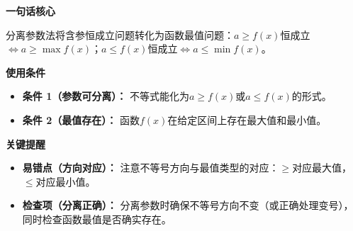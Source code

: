 \begin{summarybox}

	\textbf{\textcolor{CSummary}{一句话核心}}

	分离参数法将含参恒成立问题转化为函数最值问题：$a\ge f(x)$恒成立$\iff a\ge \max f(x)$；$a\le f(x)$恒成立$\iff a\le \min f(x)$。

	\medskip
	\textbf{\textcolor{CSummary}{使用条件}}
	\begin{itemize}[leftmargin=*, itemsep=0.5em, topsep=0.4em]
		\item \textbf{条件 1（参数可分离）：} 不等式能化为$a\ge f(x)$或$a\le f(x)$的形式。
		\item \textbf{条件 2（最值存在）：} 函数$f(x)$在给定区间上存在最大值和最小值。
	\end{itemize}

	\medskip
	\textbf{\textcolor{CSummary}{关键提醒}}
	\begin{itemize}[leftmargin=*, itemsep=0.5em, topsep=0.4em]
		\item \textbf{易错点（方向对应）：} 注意不等号方向与最值类型的对应：$\ge$对应最大值，$\le$对应最小值。
		\item \textbf{检查项（分离正确）：} 分离参数时确保不等号方向不变（或正确处理变号），同时检查函数最值是否确实存在。
	\end{itemize}
\end{summarybox}
